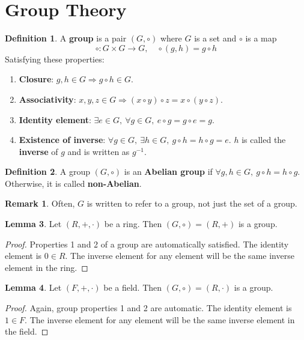 \documentclass[12pt,a4paper]{article}
\theoremstyle{definition}
\newtheorem{definition}{Definition}[subsection]
\newtheorem{lemma}[definition]{Lemma}
\newtheorem*{remark}{Remark}
\begin{document}
\section{Group Theory}

\begin{definition}
	A \textbf{group} is a pair $(G, \circ)$ where $G$ is a set and $\circ$ is a map
	\[
		\circ: G \times G \rightarrow G, \quad \circ (g, h) = g \circ h
	\]
	Satisfying these properties:
	\begin{enumerate}
		\item \textbf{Closure}: $g, h \in G \Rightarrow g \circ h \in G$.
		\item \textbf{Associativity}: $x, y, z \in G \Rightarrow (x \circ y) \circ z = x \circ (y \circ z)$.
		\item \textbf{Identity element}: $\exists e \in G, \ \forall g \in G, \ e \circ g = g \circ e = g$.
		\item \textbf{Existence of inverse}: $\forall g \in G, \ \exists h \in G, \ g \circ h = h \circ g = e$. $h$ is called the \textbf{inverse} of $g$ and is written as $g^{-1}$.
	\end{enumerate}
\end{definition}

\begin{definition}
	A group $(G, \circ)$ is an \textbf{Abelian group} if $\forall g, h \in G, \ g \circ h = h \circ g$. Otherwise, it is called \textbf{non-Abelian}.
\end{definition}

\begin{remark}
	Often, $G$ is written to refer to a group, not just the set of a group.
\end{remark}

\begin{lemma}
	Let $(R, +, \cdot)$ be a ring. Then $(G, \circ) = (R, +)$ is a group.
\end{lemma}

\begin{proof}
	Properties 1 and 2 of a group are automatically satisfied. The identity element is $0 \in R$. The inverse element for any element will be the same inverse element in the ring.
\end{proof}

\begin{lemma}
	Let $(F, +, \cdot)$ be a field. Then $(G, \circ) = (R, \cdot)$ is a group.
\end{lemma}

\begin{proof}
	Again, group properties 1 and 2 are automatic. The identity element is $1 \in F$. The inverse element for any element will be the same inverse element in the field.
\end{proof}
\end{document}
